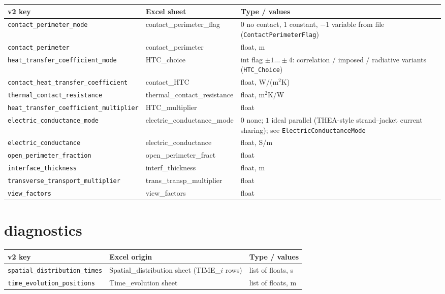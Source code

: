 \documentclass[10pt,a4paper]{article}
\newcommand{\code}[1]{\texttt{#1}}
\begin{document}
\begin{longtable}{p{6.2cm}p{4.0cm}p{5.0cm}}
\toprule
\textbf{v2 key} & \textbf{Excel sheet} & \textbf{Type / values} \\
\midrule
\endhead
\code{contact\_perimeter\_mode} & contact\_perimeter\_flag & $0$ no contact, $1$ constant, $-1$ variable from file (\code{ContactPerimeterFlag}) \\
\code{contact\_perimeter} & contact\_perimeter & float, m \\
\code{heat\_transfer\_coefficient\_mode} & HTC\_choice & int flag $\pm1\dots\pm4$: correlation / imposed / radiative variants (\code{HTC\_Choice}) \\
\code{contact\_heat\_transfer\_coefficient} & contact\_HTC & float, W/(m$^2$K) \\
\code{thermal\_contact\_resistance} & thermal\_contact\_resistance & float, m$^2$K/W \\
\code{heat\_transfer\_coefficient\_multiplier} & HTC\_multiplier & float \\
\code{electric\_conductance\_mode} & electric\_conductance\_mode & $0$ none; $1$ ideal parallel (THEA-style strand--jacket current sharing); see \code{ElectricConductanceMode} \\
\code{electric\_conductance} & electric\_conductance & float, S/m \\
\code{open\_perimeter\_fraction} & open\_perimeter\_fract & float \\
\code{interface\_thickness} & interf\_thickness & float, m \\
\code{transverse\_transport\_multiplier} & trans\_transp\_multiplier & float \\
\code{view\_factors} & view\_factors & float \\
\bottomrule
\end{longtable}

\section*{diagnostics}

\begin{longtable}{p{6.2cm}p{4.0cm}p{5.0cm}}
\toprule
\textbf{v2 key} & \textbf{Excel origin} & \textbf{Type / values} \\
\midrule
\endhead
\code{spatial\_distribution\_times} & Spatial\_distribution sheet (TIME\_$i$ rows) & list of floats, s \\
\code{time\_evolution\_positions} & Time\_evolution sheet & list of floats, m \\
\bottomrule
\end{longtable}
\end{document}
